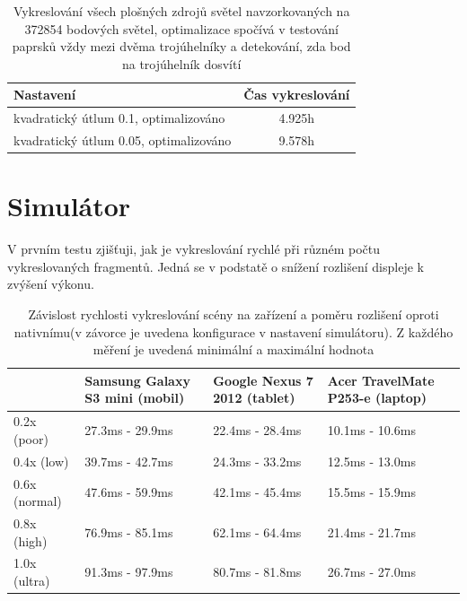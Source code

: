 \documentclass[11pt,twoside,a4paper]{book}
\begin{document}
\begin{table}[h!]
\begin{center}
\begin{tabular}{|p{100mm}|c|}
\hline
\textbf{Nastavení} & \textbf{Čas vykreslování} \\
\hline
kvadratický útlum 0.1, optimalizováno & 4.925h\\ \hline
kvadratický útlum 0.05, optimalizováno & 9.578h\\ \hline
\end{tabular}
\caption{Vykreslování všech plošných zdrojů světel navzorkovaných na 372854 bodových světel, optimalizace spočívá v testování paprsků vždy mezi dvěma trojúhelníky a detekování, zda bod na trojúhelník dosvítí }
\end{center}
\end{table}
\newpage

\section{Simulátor}
V prvním testu zjišťuji, jak je vykreslování rychlé při různém počtu vykreslovaných fragmentů. Jedná se v podstatě o snížení rozlišení displeje k zvýšení výkonu.

\begin{table}[h!]
\begin{center}
\begin{tabular}{|p{35mm}|p{35mm}|p{35mm}|p{35mm}|}
\hline
& \textbf{Samsung Galaxy S3 mini (mobil)} & \textbf{Google Nexus 7 2012 (tablet)} & \textbf{Acer TravelMate P253-e (laptop)} \\
\hline
0.2x (poor) & 27.3ms - 29.9ms & 22.4ms - 28.4ms & 10.1ms - 10.6ms \\ \hline
0.4x (low) & 39.7ms - 42.7ms & 24.3ms - 33.2ms & 12.5ms - 13.0ms \\ \hline
0.6x (normal) & 47.6ms - 59.9ms & 42.1ms - 45.4ms & 15.5ms - 15.9ms \\ \hline
0.8x (high) & 76.9ms - 85.1ms & 62.1ms - 64.4ms & 21.4ms - 21.7ms \\ \hline
1.0x (ultra) & 91.3ms - 97.9ms & 80.7ms - 81.8ms & 26.7ms - 27.0ms \\ \hline
\end{tabular}
\caption{Závislost rychlosti vykreslování scény na zařízení a poměru rozlišení oproti nativnímu(v závorce je uvedena konfigurace v nastavení simulátoru). Z každého měření je uvedená minimální a maximální hodnota}
\end{center}
\end{table}
\end{document}
